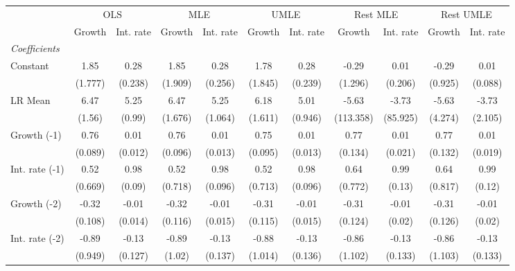 \begin{table}[htbp] 
	\centering
	\begin{tabular}{@{\extracolsep{4pt}}lcccccccccc@{}}		\hline\hline
		 		 & \multicolumn{2}{c}{OLS} &\multicolumn{2}{c}{MLE} &\multicolumn{2}{c}{UMLE} &\multicolumn{2}{c}{Rest MLE} &\multicolumn{2}{c}{Rest UMLE} \\ 
 		 & Growth 	 & Int. rate 	 & Growth 	 & Int. rate 	 & Growth 	 & Int. rate 	 & Growth 	 & Int. rate 	 & Growth 	 & Int. rate\\\cline{2-3}\cline{4-5}\cline{6-7}\cline{8-9}\cline{10-11}
\rule{0pt}{4ex} 
 \emph{Coefficients} 	  		 & 		 & 		 & 		 & 		 & 		 & 		 & 		 & 		 & 		 &\\ 
\quad Constant 	 & 1.85 	 & 0.28 	 & 1.85 	 & 0.28 	 & 1.78 	 & 0.28 	 & -0.29 	 & 0.01 	 & -0.29 	 & 0.01	 \\ 
 		 & (1.777) 	 & (0.238) 	 & (1.909) 	 & (0.256) 	 & (1.845) 	 & (0.239) 	 & (1.296) 	 & (0.206) 	 & (0.925) 	 & (0.088) 	 \\ 
\quad LR Mean 	 & 6.47 	 & 5.25 	 & 6.47 	 & 5.25 	 & 6.18 	 & 5.01 	 & -5.63 	 & -3.73 	 & -5.63 	 & -3.73	 \\ 
 		 & (1.56) 	 & (0.99) 	 & (1.676) 	 & (1.064) 	 & (1.611) 	 & (0.946) 	 & (113.358) 	 & (85.925) 	 & (4.274) 	 & (2.105) 	 \\ 
\quad Growth (-1) 	 &0.76 	 & 0.01 	 & 0.76 	 & 0.01 	 & 0.75 	 & 0.01 	 & 0.77 	 & 0.01 	 & 0.77 	 & 0.01	 \\ 
 		 & (0.089) 	 & (0.012) 	 & (0.096) 	 & (0.013) 	 & (0.095) 	 & (0.013) 	 & (0.134) 	 & (0.021) 	 & (0.132) 	 & (0.019) 	 \\ 
\quad Int. rate (-1) 	 &0.52 	 & 0.98 	 & 0.52 	 & 0.98 	 & 0.52 	 & 0.98 	 & 0.64 	 & 0.99 	 & 0.64 	 & 0.99	 \\ 
 		 & (0.669) 	 & (0.09) 	 & (0.718) 	 & (0.096) 	 & (0.713) 	 & (0.096) 	 & (0.772) 	 & (0.13) 	 & (0.817) 	 & (0.12) 	 \\ 
\quad Growth (-2) 	 &-0.32 	 & -0.01 	 & -0.32 	 & -0.01 	 & -0.31 	 & -0.01 	 & -0.31 	 & -0.01 	 & -0.31 	 & -0.01	 \\ 
 		 & (0.108) 	 & (0.014) 	 & (0.116) 	 & (0.015) 	 & (0.115) 	 & (0.015) 	 & (0.124) 	 & (0.02) 	 & (0.126) 	 & (0.02) 	 \\ 
\quad Int. rate (-2) 	 &-0.89 	 & -0.13 	 & -0.89 	 & -0.13 	 & -0.88 	 & -0.13 	 & -0.86 	 & -0.13 	 & -0.86 	 & -0.13	 \\ 
 		 & (0.949) 	 & (0.127) 	 & (1.02) 	 & (0.137) 	 & (1.014) 	 & (0.136) 	 & (1.102) 	 & (0.133) 	 & (1.103) 	 & (0.133) 	 \\ 

\end{tabular}
\end{table}
